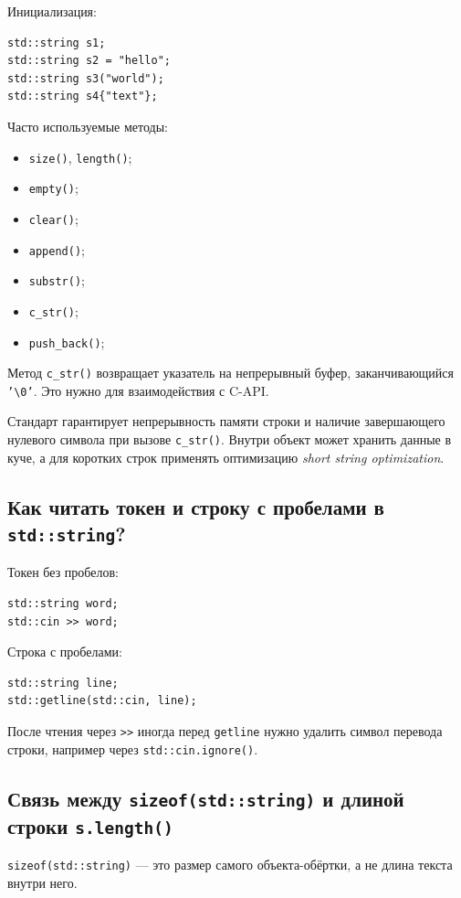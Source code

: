Инициализация:
\begin{verbatim}
std::string s1;
std::string s2 = "hello";
std::string s3("world");
std::string s4{"text"};
\end{verbatim}

Часто используемые методы:
\begin{itemize}
    \item \texttt{size()}, \texttt{length()};
    \item \texttt{empty()};
    \item \texttt{clear()};
    \item \texttt{append()};
    \item \texttt{substr()};
    \item \texttt{c\_str()};
    \item \texttt{push\_back()};
\end{itemize}

Метод \texttt{c\_str()} возвращает указатель на непрерывный буфер, заканчивающийся \texttt{'\textbackslash 0'}. Это нужно для взаимодействия с C-API.

\begin{remark}
Стандарт гарантирует непрерывность памяти строки и наличие завершающего нулевого символа при вызове \texttt{c\_str()}. Внутри объект может хранить данные в куче, а для коротких строк применять оптимизацию \textit{short string optimization}.
\end{remark}

\subsection{Как читать токен и строку с пробелами в \texttt{std::string}?}
Токен без пробелов:
\begin{verbatim}
std::string word;
std::cin >> word;
\end{verbatim}

Строка с пробелами:
\begin{verbatim}
std::string line;
std::getline(std::cin, line);
\end{verbatim}

\begin{remark}
После чтения через \texttt{>>} иногда перед \texttt{getline} нужно удалить символ перевода строки, например через \texttt{std::cin.ignore()}.
\end{remark}

\subsection{Связь между \texttt{sizeof(std::string)} и длиной строки \texttt{s.length()}}
\texttt{sizeof(std::string)} — это размер самого объекта-обёртки, а не длина текста внутри него.

